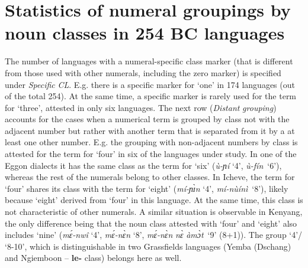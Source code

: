 \begin{table}
\caption{Tivoid}
\end{table}

\normalsize 

\clearpage
\chapter{Statistics of numeral groupings by noun classes in 254 BC languages}


 The number of languages with a numeral-specific class marker (that is different from those used with other numerals, including the zero marker) is specified under \textit{Specific} \textit{CL}. E.g. there is a specific marker for ‘one’ in 174 languages (out of the total 254). At the same time, a specific marker is rarely used for the term for ‘three’, attested in only six languages. The next row (\textit{Distant} \textit{grouping}) accounts for the cases when a numerical term is grouped by class not with the adjacent number but rather with another term that is separated from it by a at least one other number. E.g. the grouping with non-adjacent numbers by class is attested for the term for ‘four’ in six of the languages under study. In one of the Eggon dialects it has the same class as the term for ‘six’ (\textit{{\`{u}}-ɲí} ‘4’, \textit{{\`{u}}-fín}~‘6’), whereas the rest of the numerals belong to other classes. In Icheve, the term for ‘four’ shares its class with the term for ‘eight’ (\textit{mí-ɲ{\`{ɪ}}n} ‘4’, \textit{mí-n{\`{u}}ínì}~‘8’), likely because ‘eight’ derived from ‘four’ in this language. At the same time, this class is not characteristic of other numerals. A similar situation is observable in Kenyang, the only difference being that the noun class attested with ‘four’ and ‘eight’ also includes ‘nine’ (\textit{m{\'{ɛ}}-nw{\^{i}}} ‘4’, \textit{m{\'{ɛ}}-n{\`{ɛ}}n} ‘8’, \textit{m{\'{ɛ}}-n{\`{ɛ}}n} \textit{n{\`{ɛ}}} \textit{àm{\`{ɔ}}t}~‘9’ (8+1)). The group ‘4’/ ‘8-10’, which is distinguishable in two Grassfields languages (Yemba (Dschang) and Ngiemboon – \textbf{le-} class) belongs here as well. 
 
